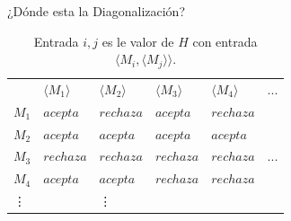 \documentclass[11pt]{beamer}
\begin{document}
		
		\begin{frame}{¿Dónde esta la Diagonalización?}
		
		    \justifying
		    
		    \begin{table}[]
              \begin{tabular}{llllll}
                    & $\langle M_1 \rangle$   &  $\langle M_2 \rangle$      & $\langle M_3 \rangle$      & $\langle M_4 \rangle$      & ... \\ \cline{2-6}
              \multicolumn{1}{l|}{$M_1$} & $acepta$ & $rechaza$ & $acepta$ & $rechaza$ &      \\
              \multicolumn{1}{l|}{$M_2$} & $acepta$ & $acepta$ & $acepta$ & $acepta$ &    \\
              \multicolumn{1}{l|}{$M_3$} & $rechaza$ & $rechaza$ & $rechaza$ & $rechaza$ & ...        \\
              \multicolumn{1}{l|}{$M_4$} & $acepta$ & $acepta$ & $rechaza$ & $rechaza$       &        \\
              \multicolumn{1}{l|}{\vdots}   &        & \vdots     &        &        &    
              \end{tabular}
              \caption{Entrada $i,j$ es le valor de $H$ con entrada $\langle M_i, \langle M_j \rangle \rangle$.}
               \label{table:aceptaRechaza}
             \end{table}
			
		\end{frame}
		
\end{document}
